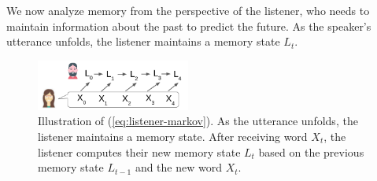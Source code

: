 \documentclass[11pt,letterpaper]{article}
\begin{document}



We now analyze memory from the perspective of the listener, who needs to maintain information about the past to predict the future.
As the speaker's utterance unfolds, the listener maintains a memory state $L_t$.



\begin{figure}
\includegraphics[width=0.45\textwidth]{figures/markov-condition.png}
	\caption{Illustration of (\ref{eq:listener-markov}). As the utterance unfolds, the listener maintains a memory state. After receiving word $X_t$, the listener computes their new memory state $L_t$ based on the previous memory state $L_{t-1}$ and the new word $X_t$.}\label{fig:listener-markov}
\end{figure}
\end{document}
